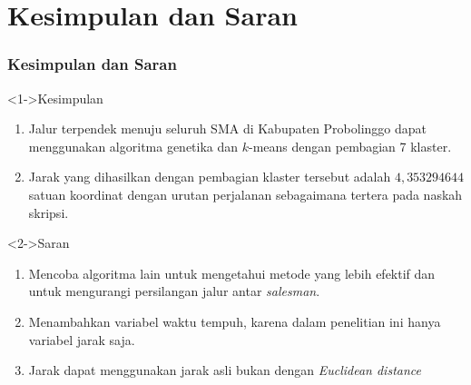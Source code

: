 \section{Kesimpulan dan Saran}
\begin{frame}
\frametitle{Kesimpulan dan Saran}

\begin{block}<1->{Kesimpulan}
\begin{enumerate}
\item Jalur terpendek menuju seluruh SMA di Kabupaten Probolinggo dapat menggunakan algoritma genetika dan $k$-means dengan pembagian 7 klaster.
\item Jarak yang dihasilkan dengan pembagian klaster tersebut adalah $4,353294644$ satuan koordinat dengan urutan perjalanan sebagaimana tertera pada naskah skripsi.
\end{enumerate}
\end{block}

\begin{block}<2->{Saran}
\begin{enumerate}
\item Mencoba algoritma lain untuk mengetahui metode yang lebih efektif dan untuk mengurangi persilangan jalur antar \textit{salesman}.
\item Menambahkan variabel waktu tempuh, karena dalam penelitian ini hanya variabel jarak saja.
\item Jarak dapat menggunakan jarak asli bukan dengan \textit{Euclidean distance}
\end{enumerate}
\end{block}
\end{frame}